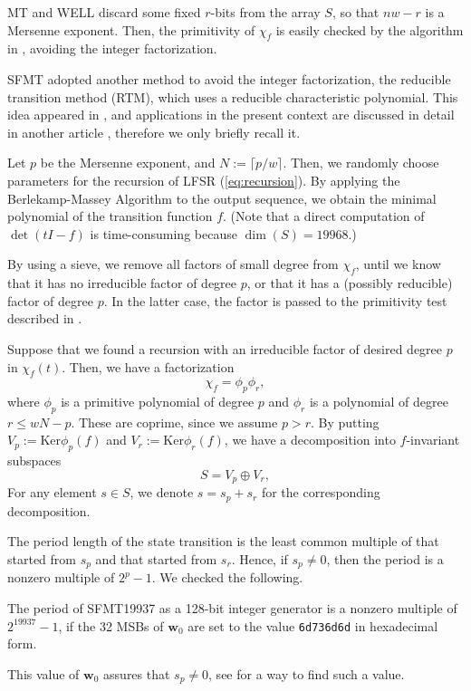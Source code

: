 \documentclass{svmult}
\def\bw{{{\mathbf w}}}
\def\ker{{\mathrm{Ker}}}
\begin{document}
MT and WELL\cite{WELL} discard some fixed $r$-bits from the
array $S$, so that $nw-r$ is a Mersenne exponent. 
Then, the primitivity of $\chi_f$ is easily checked
by the algorithm in \cite[\S3.2.2]{knuth:bible},
avoiding the integer factorization.

SFMT adopted
another method to avoid the integer factorization,
the reducible transition method (RTM), 
which uses a reducible characteristic polynomial.
This idea appeared in \cite{FUSHIMI90}
\cite{BRENT}\cite{BRENT-PRIM}, and 
applications in the present context are 
discussed in detail in another article \cite{PMT}, 
therefore we only briefly recall it. 

Let $p$ be the Mersenne exponent, and $N:=\lceil p/w \rceil$.
Then, we randomly choose parameters for the recursion of LFSR
(\ref{eq:recursion}).
By applying the Berlekamp-Massey Algorithm to 
the output sequence, we obtain the 
minimal polynomial of the transition function $f$.
(Note that a direct computation of $\det(tI-f)$ is time-consuming
 because $\dim(S)=19968$.)

By using a sieve, we remove all 
factors of small degree from $\chi_f$,
until we know that it has no irreducible factor of degree $p$,
or that it has a (possibly reducible) factor of degree $p$. 
In the latter case, the factor is 
passed to the primitivity test described 
in \cite[\S3.2.2]{knuth:bible}.

Suppose that we found a recursion with an irreducible factor of 
desired degree $p$ in $\chi_f(t)$. Then, 
we have a factorization
$$
\chi_f=\phi_p \phi_r,
$$
where $\phi_p$ is a primitive polynomial of degree $p$
and $\phi_r$ is a polynomial of degree $r \leq wN-p$. These are coprime, 
since we assume $p>r$.
By putting $V_p:=\ker \phi_p(f)$ 
and $V_r:=\ker \phi_r(f)$, 
we have a decomposition into $f$-invariant subspaces
$$
S=V_p \oplus V_r,
$$
For any element $s \in S$, we denote $s=s_p+s_r$ for the corresponding
decomposition. 

The period length of the state transition is the least common multiple
of that started from $s_p$ and that started from $s_r$. Hence, 
if $s_p \neq 0$, then the period is a nonzero multiple of $2^p-1$. 
We checked the following. 
\begin{proposition}
The period of SFMT19937 as a 128-bit integer generator is 
a nonzero multiple of $2^{19937}-1$, if the 32 MSBs of 
$\bw_0$ are set to 
the value {\tt 6d736d6d} in hexadecimal form.
\end{proposition}
This value of $\bw_0$ assures that $s_p\neq 0$,
see \cite{PMT} for a way to find such a value.
\end{document}
